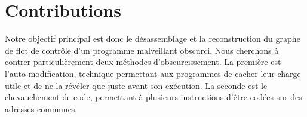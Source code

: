 
\section*{Contributions}
% 
Notre objectif principal est donc le désassemblage et la reconstruction du graphe de flot de contrôle d'un programme malveillant obscurci.
Nous cherchons à contrer particulièrement deux méthodes d'obscurcissement. 
La première est l'auto-modification, technique permettant aux programmes de cacher leur charge utile et de ne la révéler que juste avant son exécution. La seconde est le chevauchement de code, permettant à plusieurs instructions d'être codées sur des adresses communes.

